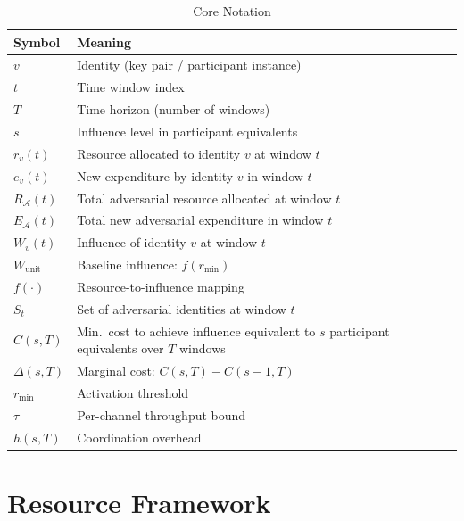 \documentclass[manuscript,review]{acmart}
\theoremstyle{remark}
\begin{document}
	\begin{table}[htbp]
		\caption{Core Notation}
		\label{tab:notation}
		\renewcommand{\arraystretch}{1.25}
		\begin{tabular}{@{}ll@{}}
			\toprule
			\textbf{Symbol} & \textbf{Meaning} \\
			\midrule
			$v$                  & Identity (key pair / participant instance) \\
			$t$                  & Time window index \\
			$T$                  & Time horizon (number of windows) \\
			$s$                  & Influence level in participant equivalents \\
			$r_v(t)$             & Resource allocated to identity $v$ at window $t$ \\
			$e_v(t)$             & New expenditure by identity $v$ in window $t$ \\
			$R_{\mathcal{A}}(t)$ & Total adversarial resource allocated at window $t$ \\
			$E_{\mathcal{A}}(t)$ & Total new adversarial expenditure in window $t$ \\
			$W_v(t)$             & Influence of identity $v$ at window $t$ \\
			$W_{\mathrm{unit}}$  & Baseline influence: $f(r_{\min})$ \\
			$f(\cdot)$           & Resource-to-influence mapping \\
			$S_t$                & Set of adversarial identities at window $t$ \\
			$C(s,T)$             & Min.\ cost to achieve influence equivalent to $s$ participant equivalents over $T$ windows \\
			$\Delta(s,T)$        & Marginal cost: $C(s,T) - C(s-1,T)$ \\
			$r_{\min}$           & Activation threshold \\
			$\tau$               & Per-channel throughput bound \\
			$h(s,T)$             & Coordination overhead \\
			\bottomrule
		\end{tabular}
	\end{table}
	\section{Resource Framework}
	\label{sec:framework}
	
\end{document}

